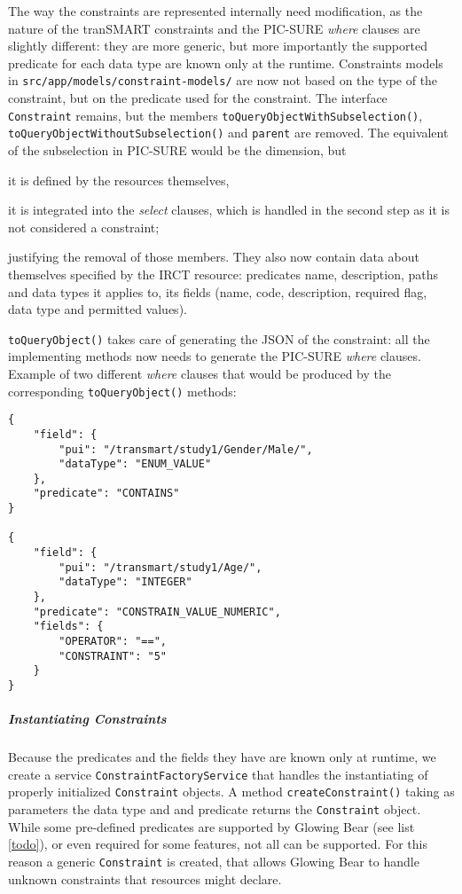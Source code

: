 The way the constraints are represented internally need modification, as the nature of the tranSMART constraints and the PIC-SURE \emph{where} clauses are slightly different: they are more generic, but more importantly the supported predicate for each data type are known only at the runtime.
Constraints models in \verb|src/app/models/constraint-models/| are now not based on the type of the constraint, but on the predicate used for the constraint.
The interface \verb|Constraint| remains, but the members \verb|toQueryObjectWithSubselection()|, \verb|toQueryObjectWithoutSubselection()| and \verb|parent| are removed.
The equivalent of the subselection in PIC-SURE would be the dimension, but 
\begin{enumerate*}[label=(\arabic*)]
  \item it is defined by the resources themselves,
  \item it is integrated into the \emph{select} clauses, which is handled in the second step as it is not considered a constraint;
\end{enumerate*}
justifying the removal of those members.
They also now contain data about themselves specified by the IRCT resource: predicates name, description, paths and data types it applies to, its fields (name, code, description, required flag, data type and permitted values).

\verb|toQueryObject()| takes care of generating the JSON of the constraint: all the implementing methods now needs to generate the PIC-SURE \emph{where} clauses.
Example of two different \emph{where} clauses that would be produced by the corresponding \verb|toQueryObject()| methods:
\begin{verbatim}
{
    "field": {
        "pui": "/transmart/study1/Gender/Male/",
        "dataType": "ENUM_VALUE"
    },
    "predicate": "CONTAINS"
}

{
    "field": {
        "pui": "/transmart/study1/Age/",
        "dataType": "INTEGER"
    },
    "predicate": "CONSTRAIN_VALUE_NUMERIC",
    "fields": {
        "OPERATOR": "==",
        "CONSTRAINT": "5"
    }
}
\end{verbatim}

\subparagraph{Instantiating Constraints}
Because the predicates and the fields they have are known only at runtime, we create a service \verb|ConstraintFactoryService| that handles the instantiating of properly initialized \verb|Constraint| objects.
A method \verb|createConstraint()| taking as parameters the data type and and predicate returns the \verb|Constraint| object.
While some pre-defined predicates are supported by Glowing Bear (see list \ref{todo}), or even required for some features, not all can be supported. 
For this reason a generic \verb|Constraint| is created, that allows Glowing Bear to handle unknown constraints that resources might declare.

